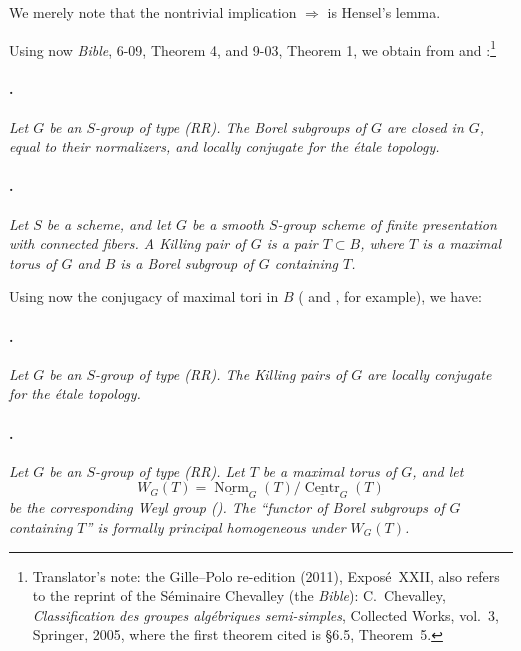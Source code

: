 We merely note that the nontrivial implication
\textup{}\(\Rightarrow\)\textup{} is Hensel's lemma.

Using now \textit{Bible}, 6-09, Theorem 4, and 9-03,
Theorem 1, we obtain from  and :\footnote{Translator's note: the Gille--Polo re-edition (2011), Exposé~XXII,
also refers to the reprint of the Séminaire Chevalley (the \emph{Bible}):
C.~Chevalley, \emph{Classification des groupes algébriques semi-simples},
Collected Works, vol.~3, Springer, 2005, where the first theorem cited is
\S6.5, Theorem~5.}

\paragraph{.}
\textit{Let \(G\) be an \(S\)-group of type \textup{(RR)}. The
Borel subgroups of \(G\) are closed in \(G\), equal to their
normalizers, and locally conjugate for the étale topology.}

\paragraph{.}
\textit{Let \(S\) be a scheme, and let \(G\) be a smooth
\(S\)-group scheme of finite presentation with connected
fibers. A \emph{Killing pair}
of \(G\) is a pair \(T\subset B\), where \(T\) is a maximal torus
of \(G\) and \(B\) is a Borel subgroup of \(G\) containing \(T\).}

Using now the conjugacy of maximal tori in \(B\)
\textup{( \textup{} and , for example)}, we have:

\paragraph{.}
\textit{Let \(G\) be an \(S\)-group of type \textup{(RR)}. The
Killing pairs of \(G\) are locally conjugate for the étale topology.}

\paragraph{.}
\textit{Let \(G\) be an \(S\)-group of type \textup{(RR)}. Let
\(T\) be a maximal torus of \(G\), and let}
\[
  W_G(T)
  =
  \underline{\operatorname{Norm}}_G(T)/
  \underline{\operatorname{Centr}}_G(T)
\]
\textit{be the corresponding Weyl group \textup{()}. The ``functor of Borel subgroups of \(G\) containing \(T\)''
is formally principal homogeneous under \(W_G(T)\).}

